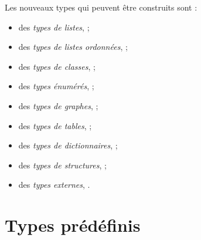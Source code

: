 
Les nouveaux types qui peuvent être construits sont :
\begin{itemize}
  \item des \emph{types de listes},  ;
  \item des \emph{types de listes ordonnées},  ;
  \item des \emph{types de classes},  ;
  \item des \emph{types énumérés},  ;
  \item des \emph{types de graphes},  ;
  \item des \emph{types de tables},  ;
  \item des \emph{types de dictionnaires},  ;
  \item des \emph{types de structures},  ;
  \item des \emph{types externes}, .
\end{itemize}









\section{Types prédéfinis}

